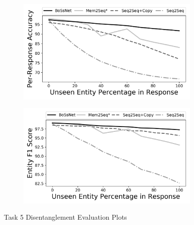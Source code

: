 \begin{figure}[!t]
\centering
\begin{subfigure}{0.8\textwidth}
 \includegraphics[width=\linewidth]{assets/graphs/task5_Acc.png}
 \caption{}\label{fig:t5Acc}
\end{subfigure}

\vspace*{0.5in}

\begin{subfigure}{0.8\textwidth}
 \includegraphics[width=\linewidth]{assets/graphs/task5_F1.png}
 \caption{}\label{fig:t5F1}
\end{subfigure}

\caption{Task 5 Disentanglement Evaluation Plots}
\end{figure}

\clearpage


